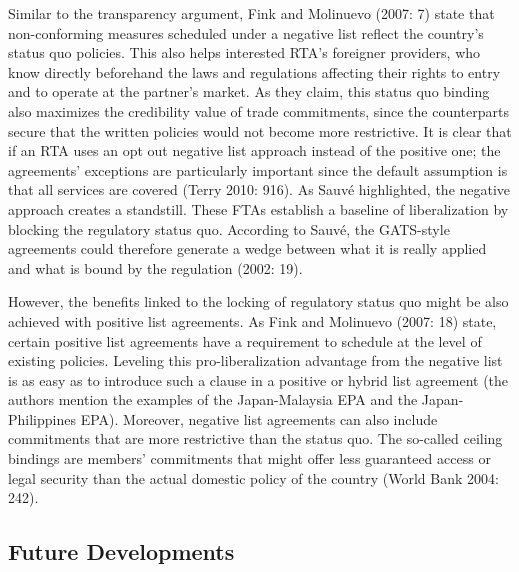 \documentclass{article}
\begin{document}
Similar to the transparency argument, Fink and Molinuevo (2007: 7) state that non-conforming measures scheduled under a negative list reflect the country’s status quo policies. This also helps interested RTA’s foreigner providers, who know directly beforehand the laws and regulations affecting their rights to entry and to operate at the partner’s market. As they claim, this status quo binding also maximizes the credibility value of trade commitments, since the counterparts secure that the written policies would not become more restrictive. It is clear that if an RTA uses an opt out negative list approach instead of the positive one; the agreements’ exceptions are particularly important since the default assumption is that all services are covered (Terry 2010: 916). As Sauvé highlighted, the negative approach creates a standstill. These FTAs establish a baseline of liberalization by blocking the regulatory status quo. According to Sauvé, the GATS-style agreements could therefore generate a wedge between what it is really applied and what is bound by the regulation (2002: 19).

\smallskip

However, the benefits linked to the locking of regulatory status quo might be also achieved with positive list agreements. As Fink and Molinuevo (2007: 18) state, certain positive list agreements have a requirement to schedule at the level of existing policies. Leveling this pro-liberalization advantage from the negative list is as easy as to introduce such a clause in a positive or hybrid list agreement (the authors mention the examples of the Japan-Malaysia EPA and the Japan-Philippines EPA). Moreover, negative list agreements can also include commitments that are more restrictive than the status quo. The so-called ceiling bindings are members’ commitments that might offer less guaranteed access or legal security than the actual domestic policy of the country (World Bank 2004: 242).

\subsection{Future Developments}
\end{document}
